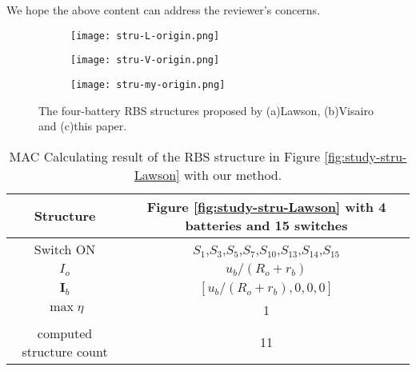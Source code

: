 \begin{revresponse}
We hope the above content can address the reviewer's concerns.

\begin{figure}[htbp]
    \centering
    \begin{subfigure}[b]{0.2\textwidth}
        \texttt{[image: stru-L-origin.png]}
        \caption{}
        \label{fig:study-stru-Lawson-comment}
    \end{subfigure}
    \hspace{0.02\textwidth}
    \begin{subfigure}[b]{0.4\textwidth}
        \texttt{[image: stru-V-origin.png]}
        \caption{}
        \label{fig:study-stru-Visairo-comment}
    \end{subfigure}
    \hspace{0.02\textwidth}
    \begin{subfigure}[b]{0.31\textwidth}
        \texttt{[image: stru-my-origin.png]}
        \caption{}
        \label{fig:study-stru-my-comment}
    \end{subfigure}
    \caption{The four-battery RBS structures proposed by (a)Lawson\cite{lawsonSoftwareConfigurableBattery2012}, (b)Visairo\cite{visairoReconfigurableBatteryPack2008} and (c)this paper.}
\end{figure}

\begin{table}[htbp]
  \centering
    \caption{MAC Calculating result of the RBS structure in Figure \ref{fig:study-stru-Lawson} with our method.}
    \begin{tabular}{cc}
    \toprule
        Structure & Figure \ref{fig:study-stru-Lawson} with 4 batteries and 15 switches  \\
    \midrule
    Switch ON & $S_1$,$S_3$,$S_5$,$S_7$,$S_{10}$,$S_{13}$,$S_{14}$,$S_{15}$ \\
    $I_o$ & $u_b/(R_o+r_b)$ \\
    $\bm{I}_b$ & $[u_b/(R_o+r_b),0,0,0]$ \\
    $\max  \eta$     & 1 \\
    computed structure count & 11 \\
    \bottomrule
    \end{tabular}
  \label{tab:study-results-Lawson-greedy}
\end{table}


\end{revresponse}

